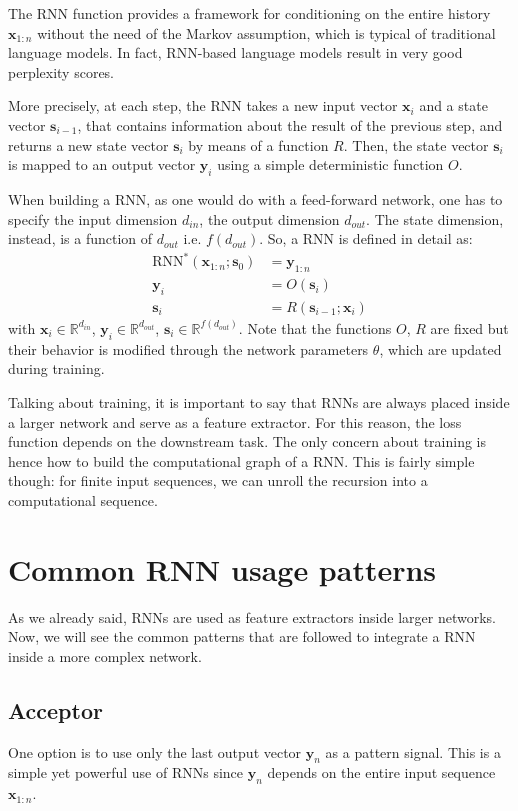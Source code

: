 The RNN function provides a framework for conditioning on the entire history $\mathbf{x}_{1:n}$ without the need of the Markov assumption, which is typical of traditional language models. In fact, RNN-based language models result in very good perplexity scores.

More precisely, at each step, the RNN takes a new input vector $\mathbf{x}_{i}$ and a state vector $\mathbf{s}_{i-1}$, that contains information about the result of the previous step, and returns a new state vector $\mathbf{s}_{i}$ by means of a function $R$. Then, the state vector $\mathbf{s}_{i}$ is mapped to an output vector $\mathbf{y}_{i}$ using a simple deterministic function $O$.

When building a RNN, as one would do with a feed-forward network, one has to specify the input dimension $d_{in}$, the output dimension $d_{out}$. The state dimension, instead, is a function of $d_{out}$ i.e. $f(d_{out})$. So, a RNN is defined in detail as:
\[
\begin{aligned}
\text{RNN}^{*}(\mathbf{x}_{1:n};\mathbf{s}_{0})&=\mathbf{y}_{1:n} \\
\mathbf{y}_{i}&=O(\mathbf{s}_{i}) \\
\mathbf{s}_{i}&=R(\mathbf{s}_{i-1};\mathbf{x}_{i})
\end{aligned}
\]
with $\mathbf{x}_{i}\in \mathbb{R}^{d_{in}}$, $\mathbf{y}_{i} \in \mathbb{R}^{d_{out}}$, $\mathbf{s}_{i}\in \mathbb{R}^{f(d_{out})}$. Note that the functions $O$, $R$ are fixed but their behavior is modified through the network parameters $\theta$, which are updated during training.

Talking about training, it is important to say that RNNs are always placed inside a larger network and serve as a feature extractor. For this reason, the loss function depends on the downstream task. The only concern about training is hence how to build the computational graph of a RNN. This is fairly simple though: for finite input sequences, we can unroll the recursion into a computational sequence.

\section{Common RNN usage patterns}
As we already said, RNNs are used as feature extractors inside larger networks. Now, we will see the common patterns that are followed to integrate a RNN inside a more complex network.

\subsection{Acceptor}
One option is to use only the last output vector $\mathbf{y}_{n}$ as a pattern signal. This is a simple yet powerful use of RNNs since $\mathbf{y}_{n}$ depends on the entire input sequence $\mathbf{x}_{1:n}$.

